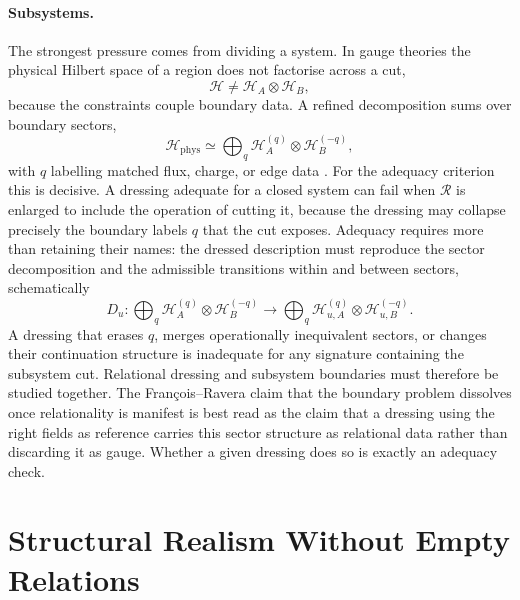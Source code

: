 \documentclass[11pt]{article}
\theoremstyle{plain}
\theoremstyle{definition}
\theoremstyle{remark}
\newcommand{\R}{\mathcal R}
\begin{document}
\paragraph{Subsystems.} The strongest pressure comes from dividing a system. In gauge theories the physical Hilbert space of a region does not factorise across a cut,
\begin{equation}
\mathcal H\neq\mathcal H_A\otimes\mathcal H_B,
\end{equation}
because the constraints couple boundary data. A refined decomposition sums over boundary sectors,
\begin{equation}\label{eq:sectors}
\mathcal H_{\mathrm{phys}}\simeq\bigoplus_q\mathcal H_A^{(q)}\otimes\mathcal H_B^{(-q)},
\end{equation}
with $q$ labelling matched flux, charge, or edge data \cite{donnelly-freidel,casini}. For the adequacy criterion this is decisive. A dressing adequate for a closed system can fail when $\R$ is enlarged to include the operation of cutting it, because the dressing may collapse precisely the boundary labels $q$ that the cut exposes. Adequacy requires more than retaining their names: the dressed description must reproduce the sector decomposition and the admissible transitions within and between sectors, schematically
\begin{equation}\label{eq:dressedsectors}
D_u:\bigoplus_q\mathcal H_A^{(q)}\otimes\mathcal H_B^{(-q)}
\longrightarrow
\bigoplus_q\mathcal H_{u,A}^{(q)}\otimes\mathcal H_{u,B}^{(-q)}.
\end{equation}
A dressing that erases $q$, merges operationally inequivalent sectors, or changes their continuation structure is inadequate for any signature containing the subsystem cut. Relational dressing and subsystem boundaries must therefore be studied together. The François--Ravera claim that the boundary problem dissolves once relationality is manifest \cite{fr-mech} is best read as the claim that a dressing using the right fields as reference carries this sector structure as relational data rather than discarding it as gauge. Whether a given dressing does so is exactly an adequacy check.

\section{Structural Realism Without Empty Relations}\label{sec:osr}
\end{document}

